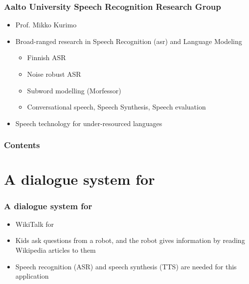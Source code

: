 %
\begin{frame}
\frametitle{Aalto University Speech Recognition Research Group}
\begin{itemize}
\item Prof. Mikko Kurimo
\item Broad-ranged research in Speech Recognition (asr) and Language Modeling
\begin{itemize}
\item Finnish ASR
\item Noise robust ASR
\item Subword modelling (Morfessor)
\item Conversational speech, Speech Synthesis, Speech evaluation
\end{itemize}

\item Speech technology for under-resourced languages
\end{itemize}
\end{frame}


\begin{frame}
\frametitle{Contents}
\tableofcontents
\end{frame}





\section{A dialogue system for \ns}
\begin{frame}
\frametitle{A dialogue system for \ns}
\begin{itemize}
\item WikiTalk for \ns
\item Kids ask questions from a robot, and the robot gives information by reading Wikipedia articles to them
\item Speech recognition (ASR) and speech synthesis (TTS) are needed for this application
\end{itemize}
\end{frame}

